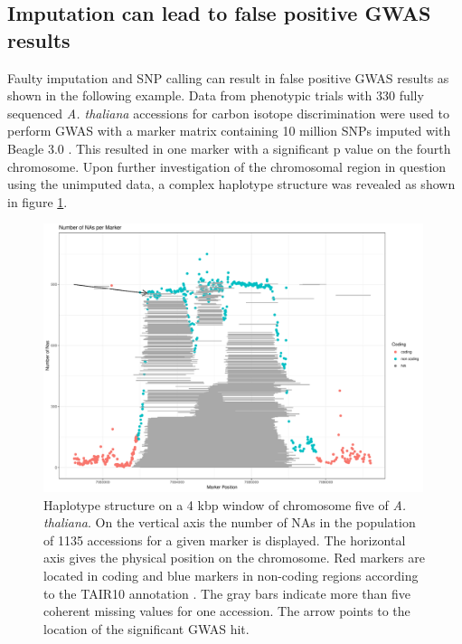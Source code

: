 \subsection{Imputation can lead to false positive GWAS results}

Faulty imputation and SNP calling can result in false positive GWAS results as shown in
the following example. Data from phenotypic trials with 330 fully sequenced
\textit{A. thaliana} accessions for carbon isotope discrimination were used to perform
GWAS with a marker matrix containing 10 million SNPs imputed with Beagle 3.0
\cite{dittberner2018natural}. This resulted in one marker with a significant p value on
the fourth chromosome. Upon further investigation of the chromosomal region in question
using the unimputed data, a complex haplotype structure was revealed as shown in figure
\ref{fig:chr_jul}.

\begin{figure}[H]
\centering
\includegraphics[height=.55\textheight, width=0.99\textwidth]{Figures/plot_NAs_AT}
\decoRule
\caption[Haplotype structure on a 1 kbp window of chromosome 4 of
\textit{A. thaliana}]{Haplotype structure on a 4 kbp window of chromosome five of
  \textit{A. thaliana}. On the vertical axis the number of NAs in the population of 1135
  accessions for a given marker is displayed. The horizontal axis gives the physical
  position on the chromosome. Red markers are located in coding and blue markers in
  non-coding regions according to the TAIR10 annotation \cite{rhee2003arabidopsis}. The
  gray bars indicate more than five coherent missing values for one accession. The arrow
  points to the location of the significant GWAS hit.}
\label{fig:chr_jul}
\end{figure}

